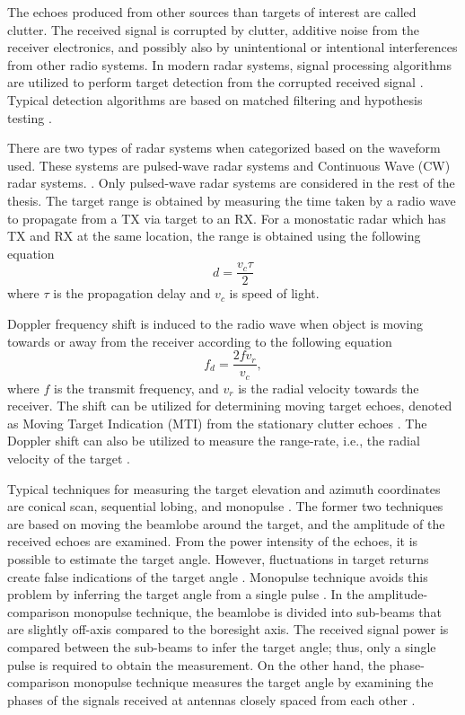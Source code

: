\documentclass[english, 12pt, a4paper, elec, utf8, a-1b, online]{aaltothesis}
\begin{document}
The echoes produced from other sources than targets of interest are called clutter.
The received signal is corrupted by clutter, additive noise from the receiver electronics, and possibly also by unintentional or intentional interferences from other radio systems.
In modern radar systems, signal processing algorithms are utilized to perform target detection from the corrupted received signal \cite{Mahafza2015}.
Typical detection algorithms are based on matched filtering and hypothesis testing \cite{Mahafza2015}.

There are two types of radar systems when categorized based on the waveform used.
These systems are pulsed-wave radar systems and Continuous Wave (CW) radar systems.  \cite{Mahafza2015}.
Only pulsed-wave radar systems are considered in the rest of the thesis.
The target range is obtained by measuring the time taken by a radio wave to propagate from a TX via target to an RX.
For a monostatic radar which has TX and RX at the same location, the range is obtained using the following equation \cite{Curry2011}
\begin{equation}
    d = \frac{ v_c \tau}{2} 
\end{equation}
where $\tau$ is the propagation delay and $v_c$ is speed of light.

Doppler frequency shift is induced to the radio wave when object is moving towards or away from the receiver according to the following equation \cite{Curry2011}
\begin{equation}
    f_d = \frac{2 f v_r}{v_c},
\end{equation}
where $f$ is the transmit frequency, and $v_r$ is the radial velocity towards the receiver.
The shift can be utilized for determining moving target echoes, denoted as Moving Target Indication (MTI) from the stationary clutter echoes \cite{Curry2011}.
The Doppler shift can also be utilized to measure the range-rate, i.e., the radial velocity of the target \cite{Curry2011}.

Typical techniques for measuring the target elevation and azimuth coordinates are conical scan, sequential lobing, and monopulse \cite{Sherman2011}. 
The former two techniques are based on moving the beamlobe around the target, and the amplitude of the received echoes are examined. 
From the power intensity of the echoes, it is possible to estimate the target angle.
However, fluctuations in target returns create false indications of the target angle \cite{Sherman2011}.
Monopulse technique avoids this problem by inferring the target angle from a single pulse \cite{Sherman2011}.
In the amplitude-comparison monopulse technique, the beamlobe is divided into sub-beams that are slightly off-axis compared to the boresight axis.  
The received signal power is compared between the sub-beams to infer the target angle; thus, only a single pulse is required to obtain the measurement.
On the other hand, the phase-comparison monopulse technique measures the target angle by examining the phases of the signals received at antennas closely spaced from each other \cite{Sherman2011}.
\end{document}
